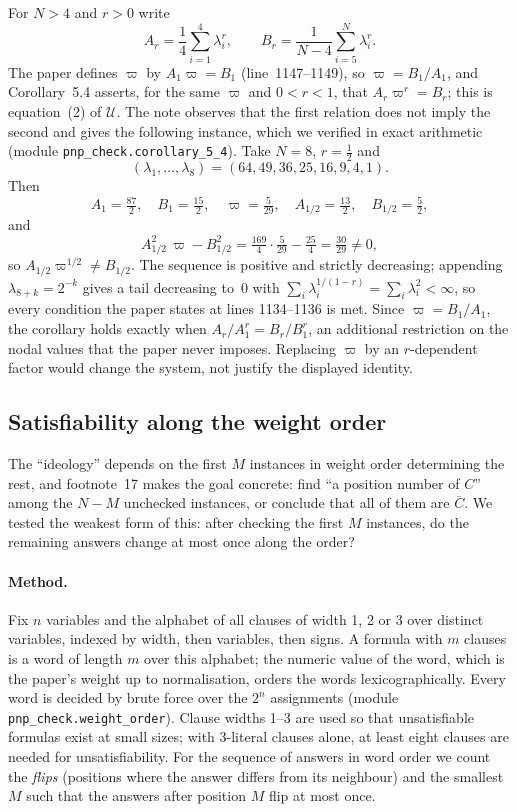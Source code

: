 \documentclass[11pt,a4paper]{article}
\newcommand{\Cbar}{\overline{C}}
\newcommand{\paperline}[1]{(line~#1)}
\begin{document}
For $N>4$ and $r>0$ write
\[
A_r=\frac14\sum_{i=1}^4\lambda_i^r,\qquad B_r=\frac1{N-4}\sum_{i=5}^N\lambda_i^r .
\]
The paper defines $\varpi$ by $A_1\varpi=B_1$ \paperline{1147--1149}, so $\varpi=B_1/A_1$, and Corollary~5.4 asserts, for the same $\varpi$ and $0<r<1$, that $A_r\varpi^r=B_r$; this is equation~(2) of $\mathcal U$. The note \cite{note} observes that the first relation does not imply the second and gives the following instance, which we verified in exact arithmetic (module \texttt{pnp\_check.corollary\_5\_4}). Take $N=8$, $r=\tfrac12$ and
\[
(\lambda_1,\ldots,\lambda_8)=(64,49,36,25,16,9,4,1).
\]
Then
\[
A_1=\tfrac{87}{2},\quad B_1=\tfrac{15}{2},\quad \varpi=\tfrac{5}{29},\quad A_{1/2}=\tfrac{13}{2},\quad B_{1/2}=\tfrac{5}{2},
\]
and
\[
A_{1/2}^2\,\varpi-B_{1/2}^2=\tfrac{169}{4}\cdot\tfrac{5}{29}-\tfrac{25}{4}=\tfrac{30}{29}\ne 0,
\]
so $A_{1/2}\varpi^{1/2}\ne B_{1/2}$. The sequence is positive and strictly decreasing; appending $\lambda_{8+k}=2^{-k}$ gives a tail decreasing to~$0$ with $\sum_i\lambda_i^{1/(1-r)}=\sum_i\lambda_i^2<\infty$, so every condition the paper states at lines 1134--1136 is met. Since $\varpi=B_1/A_1$, the corollary holds exactly when $A_r/A_1^r=B_r/B_1^r$, an additional restriction on the nodal values that the paper never imposes. Replacing $\varpi$ by an $r$-dependent factor would change the system, not justify the displayed identity.

\subsection{Satisfiability along the weight order}
\label{sec:weightorder}

The ``ideology'' depends on the first $M$ instances in weight order determining the rest, and footnote~17 makes the goal concrete: find ``a position number of $C$'' among the $N-M$ unchecked instances, or conclude that all of them are $\Cbar$. We tested the weakest form of this: after checking the first $M$ instances, do the remaining answers change at most once along the order?

\paragraph{Method.} Fix $n$ variables and the alphabet of all clauses of width 1, 2 or 3 over distinct variables, indexed by width, then variables, then signs. A formula with $m$ clauses is a word of length $m$ over this alphabet; the numeric value of the word, which is the paper's weight up to normalisation, orders the words lexicographically. Every word is decided by brute force over the $2^n$ assignments (module \texttt{pnp\_check.weight\_order}). Clause widths 1--3 are used so that unsatisfiable formulas exist at small sizes; with 3-literal clauses alone, at least eight clauses are needed for unsatisfiability. For the sequence of answers in word order we count the \emph{flips} (positions where the answer differs from its neighbour) and the smallest $M$ such that the answers after position $M$ flip at most once.
\end{document}
